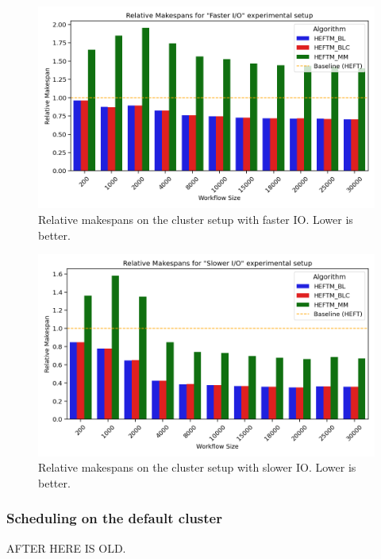 \documentclass[conference]{IEEEtran}
\begin{document}
    \begin{figure}[tb]
        \centering
        \includegraphics[width=0.9\columnwidth] {images/disk-model/rel-ms-iofast-bar}
        \caption{Relative makespans on the cluster setup with faster IO. Lower is better.}
        \label{fig:rel-ms-iofast-bar}
        \vspace{-0.3cm}
    \end{figure}


    \begin{figure}[tb]
        \centering
        \includegraphics[width=0.9\columnwidth] {images/disk-model/rel-ms-ioslow-bar}
        \caption{Relative makespans on the cluster setup with slower IO. Lower is better.}
        \label{fig:rel-ms-ioslow-bar}
        \vspace{-0.3cm}
    \end{figure}







    \subsubsection{Scheduling on the default cluster}
    AFTER HERE IS OLD.
\end{document}
